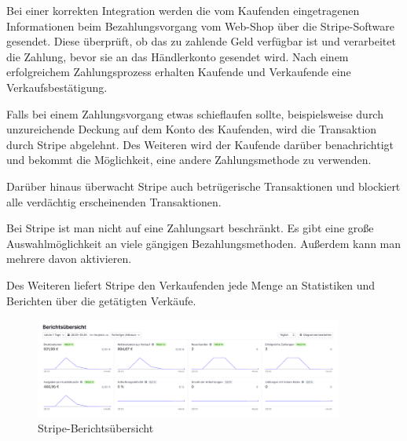 Bei einer korrekten Integration werden die vom Kaufenden eingetragenen Informationen beim Bezahlungsvorgang vom Web-Shop über die Stripe-Software gesendet. Diese überprüft, ob das zu zahlende Geld verfügbar ist und verarbeitet die Zahlung, bevor sie an das Händlerkonto gesendet wird. Nach einem erfolgreichem Zahlungsprozess erhalten Kaufende und Verkaufende eine Verkaufsbestätigung.

Falls bei einem Zahlungsvorgang etwas schieflaufen sollte, beispielsweise durch unzureichende Deckung auf dem Konto des Kaufenden, wird die Transaktion durch Stripe abgelehnt. Des Weiteren wird der Kaufende darüber benachrichtigt und bekommt die Möglichkeit, eine andere Zahlungsmethode zu verwenden.

Darüber hinaus überwacht Stripe auch betrügerische Transaktionen und blockiert alle verdächtig erscheinenden Transaktionen.

Bei Stripe ist man nicht auf eine Zahlungsart beschränkt. Es gibt eine große Auswahlmöglichkeit an viele gängigen Bezahlungsmethoden. Außerdem kann man mehrere davon aktivieren.

Des Weiteren liefert Stripe den Verkaufenden jede Menge an Statistiken und Berichten über die getätigten Verkäufe.

\cite{stripe}

\begin{figure}[H]
  \centering
  \includegraphics[width=0.9\textwidth]{pics/StripeBericht.png}
  \caption{Stripe-Berichtsübersicht}
\end{figure}